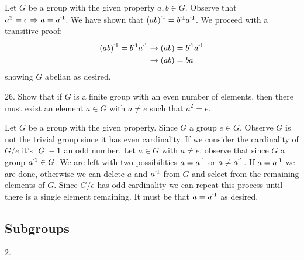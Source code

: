 \begin{mdframed}[style=darkAnswer,frametitle={Joe Starr}]
Let $G$ be a group with the given property $a,b\in G$. Observe that 
$a^2=e \Rightarrow a=\inv{a}$. We have shown that 
$\inv{\lrp{ab}}=\inv{b}\inv{a}$.
We proceed with a transitive proof: 
\begin{align*}
  \inv{\lrp{ab}}=\inv{b}\inv{a} &\rightarrow \lrp{ab}=\inv{b}\inv{a}\\
  &\rightarrow \lrp{ab}={b}{a}
\end{align*}
showing $G$ abelian as desired.
\end{mdframed}
\newpage
\begin{mdframed}[style=darkQuesion]
  26. Show that if $G$ is a finite group with an even number of elements, then 
  there must exist an element $a\in G$ with $a\neq e$ such that $a^2=e$. 
\end{mdframed}

\begin{mdframed}[style=darkAnswer,frametitle={Joe Starr}]
Let $G$ be a group with the given property. Since $G$ a group $e\in G$. 
Observe $G$ is not the trivial group since it has even cardinality. 
If we consider the cardinality of $G/e$ it's $\left\vert G\right\vert-1$ an odd number. 
Let $a\in G$ with $a\neq e$, observe that since $G$ a group $\inv{a}\in G$. 
We are left with two possibilities $a=\inv{a}$ or $a\neq \inv{a}$. 
If $a=\inv{a}$ we are done, otherwise we can delete $a$ and $\inv{a}$ from $G$ 
and select from the remaining elements of $G$. Since $G/e$ has odd cardinality 
we can repeat this process until there is a single element remaining. It must 
be that $a=\inv{a}$ as desired. 
\end{mdframed}
\newpage
\subsection{Subgroups}
\begin{mdframed}[style=darkQuesion]
  2.
\end{mdframed}


